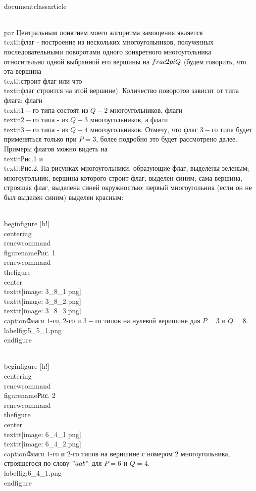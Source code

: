 \\documentclass{article}
\begin{document}
\\par Центральным понятием моего алгоритма замощения является \\textit{флаг} - построение из нескольких многоугольников, полученных последовательными поворотами одного конкретного многоугольника относительно одной выбранной его вершины на $\\frac{2\\pi}{Q}$ (будем говорить, что эта вершина \\textit{строит флаг} или что \\textit{флаг строится на} этой вершине). Количество поворотов зависит от типа флага: флаги \\textit{$1-$го типа} состоят из $Q - 2$ многоугольников, флаги \\textit{$2-$го типа} - из $Q - 3$ многоугольников, а флаги \\textit{$3-$го типа} - из $Q - 4$ многоугольников. Отмечу, что флаг $3-$го типа будет применяться только при $P=3$, более подробно это будет рассмотрено далее. Примеры флагов можно видеть на \\textit{Рис.1} и \\textit{Рис.2}. На рисунках многоугольники, образующие флаг, выделены зеленым; многоугольник, вершина которого строит флаг, выделен синим; сама вершина, строящая флаг, выделена синей окружностью; первый многоугольник (если он не был выделен синим) выделен красным:

\\begin{figure} [h!]
    \\centering
    \\renewcommand{\\figurename}{Рис. 1}
    \\renewcommand{\\thefigure}{}
    \\center{\\texttt{[image: 3\_8\_1.png]} \\texttt{[image: 3\_8\_2.png]} \\texttt{[image: 3\_8\_3.png]}}
    \\caption{Флаги $1$-го, $2$-го и $3-$го типов на нулевой веришине для $P=3$ и $Q=8$.}%
    \\label{fig:5_5_1.png}
\\end{figure}

\\begin{figure} [h!]
    \\centering
    \\renewcommand{\\figurename}{Рис. 2}
    \\renewcommand{\\thefigure}{}
    \\center{\\texttt{[image: 6\_4\_1.png]} \\texttt{[image: 6\_4\_2.png]}}
    \\caption{Флаги $1$-го и $2$-го типов на веришине с номером $2$ многоугольника, строящегося по слову $"aab"$ для $P=6$ и $Q=4$.}
    \\label{fig:6_4_1.png}
\\end{figure}
\end{document}
